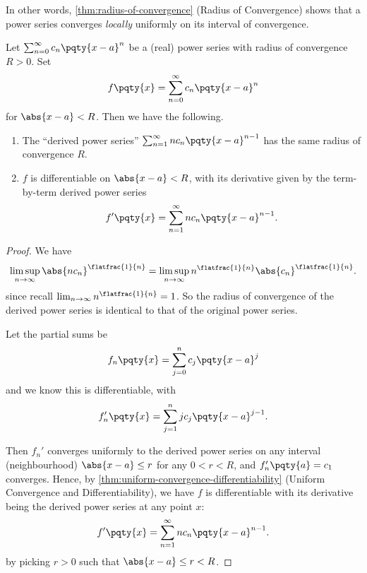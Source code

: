 In other words, \autoref{thm:radius-of-convergence} (Radius of Convergence) shows that a power series converges \emph{locally} uniformly on its interval of convergence.

\begin{theorem}
    \label{thm:differentiation-of-power-series}%
    Let \(\sum_{n = 0}^{\infty} c_n \pqty{x - a}^n\) be a (real) power series with radius of convergence \(R > 0\). Set
    \[
        f\pqty{x} = \sum_{n = 0}^{\infty} c_n \pqty{x - a}^n
    \]
    for \(\abs{x - a} < R\). Then we have the following.

    \begin{enumerate}[label=(\roman*)]
        \item The ``derived power series'' \(\sum_{n = 1}^{\infty} n c_n \pqty{x - a}^{n - 1}\) has the same radius of convergence \(R\).
        \item \(f\) is differentiable on \(\abs{x - a} < R\), with its derivative given by the term-by-term derived power series
        \[
            f'\pqty{x} = \sum_{n = 1}^{\infty} n c_n \pqty{x - a}^{n - 1}.
        \]
    \end{enumerate}
\end{theorem}

\begin{proof}
    We have
    \[
        \limsup_{n \to \infty} \abs{n c_n}^{\flatfrac{1}{n}} = \limsup_{n \to \infty} n^{\flatfrac{1}{n}} \abs{c_n}^{\flatfrac{1}{n}}.
    \]
    since recall \(\lim_{n \to \infty} n^{\flatfrac{1}{n}} = 1\). So the radius of convergence of the derived power series is identical to that of the original power series.

    Let the partial sums be
    \[
        f_n\pqty{x} = \sum_{j = 0}^{n} c_j \pqty{x - a}^j
    \]
    and we know this is differentiable, with
    \[
        f_n'\pqty{x} = \sum_{j = 1}^{n} j c_j \pqty{x - a}^{j - 1}.
    \]

    Then \(f_n'\) converges uniformly to the derived power series on any interval (neighbourhood) \(\abs{x - a} \leq r\) for any \(0 < r < R\), and \(f'_n\pqty{a} = c_1\) converges. Hence, by \autoref{thm:uniform-convergence-differentiability} (Uniform Convergence and Differentiability), we have \(f\) is differentiable with its derivative being the derived power series at any point \(x\):
    \[
        f'\pqty{x} = \sum_{n = 1}^{\infty} n c_n \pqty{x - a}^{n - 1}.
    \]
    by picking \(r > 0\) such that \(\abs{x - a} \leq r < R\).
\end{proof}

